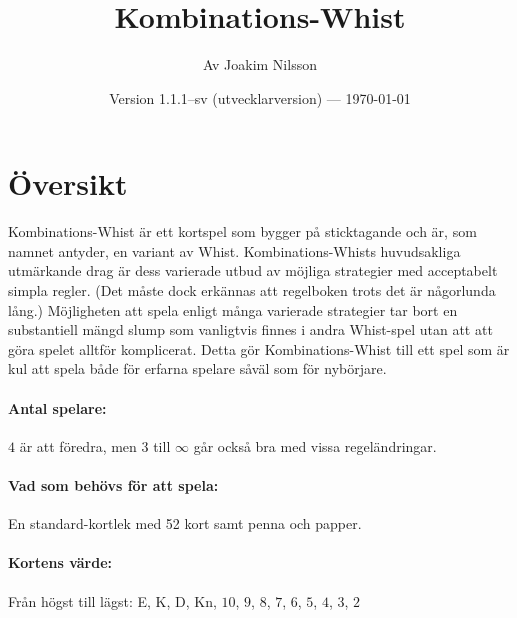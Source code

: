 \documentclass[a4paper]{article}
\title{Kombinations-Whist}
\author{Av Joakim Nilsson}
\date{Version 1.1.1--sv (utvecklarversion) --- \today}
\begin{document}
	\introPages

	\section{Översikt}{%
		Kombinations-Whist är ett kortspel som bygger på sticktagande och är, som namnet antyder, en variant av Whist. Kombinations-Whists huvudsakliga utmärkande drag är dess varierade utbud av möjliga strategier med acceptabelt simpla regler. (Det måste dock erkännas att regelboken trots det är någorlunda lång.) Möjligheten att spela enligt många varierade strategier tar bort en substantiell mängd slump som vanligtvis finnes i andra Whist-spel utan att att göra spelet alltför komplicerat. Detta gör Kombinations-Whist till ett spel som är kul att spela både för erfarna spelare såväl som för nybörjare.

		\paragraph{Antal spelare:}
		$4$ är att föredra, men $3$ till $\infty$ går också bra med vissa regeländringar.

		\paragraph{Vad som behövs för att spela:}
		En standard-kortlek med 52 kort samt penna och papper.

		\paragraph{Kortens värde:}
		Från högst till lägst: E, K, D, Kn, $10$, $9$, $8$, $7$, $6$, $5$, $4$, $3$, $2$
	}
\end{document}

